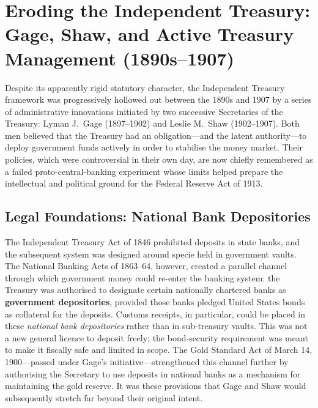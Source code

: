 \documentclass[12pt]{article}
\begin{document}
\section{Eroding the Independent Treasury: Gage, Shaw, and Active
Treasury Management (1890s--1907)}

Despite its apparently rigid statutory character, the Independent
Treasury framework was progressively hollowed out between the 1890s
and 1907 by a series of administrative innovations initiated by two
successive Secretaries of the Treasury: Lyman J.\ Gage (1897--1902)
and Leslie M.\ Shaw (1902--1907).  Both men believed that the Treasury
had an obligation---and the latent authority---to deploy government
funds actively in order to stabilise the money market.  Their policies,
which were controversial in their own day, are now chiefly remembered
as a failed proto-central-banking experiment whose limits helped prepare
the intellectual and political ground for the Federal Reserve Act of
1913.

\subsection{Legal Foundations: National Bank Depositories}

The Independent Treasury Act of 1846 prohibited deposits in state
banks, and the subsequent system was designed around specie held in
government vaults.  The National Banking Acts of 1863--64, however,
created a parallel channel through which government money could
re-enter the banking system: the Treasury was authorised to designate
certain nationally chartered banks as \textbf{government depositories},
provided those banks pledged United States bonds as collateral for the
deposits.  Customs receipts, in particular, could be placed in these
\emph{national bank depositories} rather than in sub-treasury vaults.
This was not a new general licence to deposit freely; the bond-security
requirement was meant to make it fiscally safe and limited in scope.
The Gold Standard Act of March 14, 1900---passed under Gage's
initiative---strengthened this channel further by authorising the
Secretary to use deposits in national banks as a mechanism for
maintaining the gold reserve.  It was these provisions that Gage and
Shaw would subsequently stretch far beyond their original intent.
\end{document}
